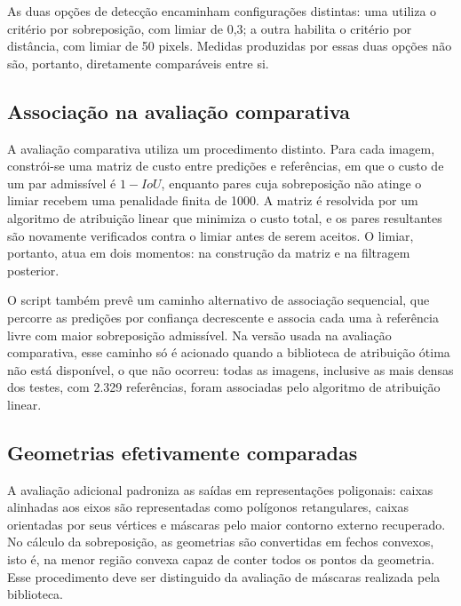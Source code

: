 As duas op\c{c}\~oes de detec\c{c}\~ao encaminham configura\c{c}\~oes distintas: uma utiliza o crit\'erio por sobreposi\c{c}\~ao, com limiar de 0,3; a outra habilita o crit\'erio por dist\^ancia, com limiar de 50 pixels. Medidas produzidas por essas duas op\c{c}\~oes n\~ao s\~ao, portanto, diretamente compar\'aveis entre si.

\subsection{Associa\c{c}\~ao na avalia\c{c}\~ao comparativa}
\label{sec:associacao-avaliacao-comparativa}

A avalia\c{c}\~ao comparativa utiliza um procedimento distinto. Para cada imagem, constr\'oi-se uma matriz de custo entre predi\c{c}\~oes e refer\^encias, em que o custo de um par admiss\'ivel \'e $1-\mathit{IoU}$, enquanto pares cuja sobreposi\c{c}\~ao n\~ao atinge o limiar recebem uma penalidade finita de 1000. A matriz \'e resolvida por um algoritmo de atribui\c{c}\~ao linear que minimiza o custo total, e os pares resultantes s\~ao novamente verificados contra o limiar antes de serem aceitos. O limiar, portanto, atua em dois momentos: na constru\c{c}\~ao da matriz e na filtragem posterior.

O script tamb\'em prev\^e um caminho alternativo de associa\c{c}\~ao sequencial, que percorre as predi\c{c}\~oes por confian\c{c}a decrescente e associa cada uma \`a refer\^encia livre com maior sobreposi\c{c}\~ao admiss\'ivel. Na vers\~ao usada na avalia\c{c}\~ao comparativa, esse caminho s\'o \'e acionado quando a biblioteca de atribui\c{c}\~ao \'otima n\~ao est\'a dispon\'ivel, o que n\~ao ocorreu: todas as imagens, inclusive as mais densas dos testes, com 2.329 refer\^encias, foram associadas pelo algoritmo de atribui\c{c}\~ao linear.

\subsection{Geometrias efetivamente comparadas}
\label{sec:geometrias-comparadas}

A avalia\c{c}\~ao adicional padroniza as sa\'idas em representa\c{c}\~oes poligonais: caixas alinhadas aos eixos s\~ao representadas como pol\'igonos retangulares, caixas orientadas por seus v\'ertices e m\'ascaras pelo maior contorno externo recuperado. No c\'alculo da sobreposi\c{c}\~ao, as geometrias s\~ao convertidas em fechos convexos, isto \'e, na menor regi\~ao convexa capaz de conter todos os pontos da geometria. Esse procedimento deve ser distinguido da avalia\c{c}\~ao de m\'ascaras realizada pela biblioteca.

